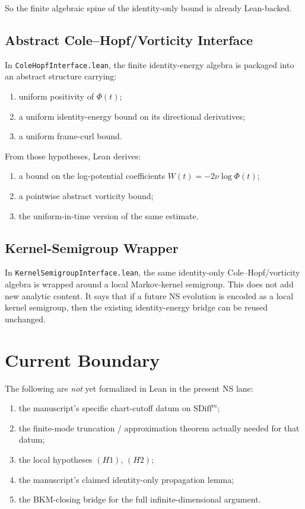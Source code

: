 \documentclass[11pt]{article}
\begin{document}
So the finite algebraic spine of the identity-only bound is already Lean-backed.

\subsection{Abstract Cole--Hopf/Vorticity Interface}

In \texttt{ColeHopfInterface.lean}, the finite identity-energy algebra is
packaged into an abstract structure carrying:
\begin{enumerate}[leftmargin=1.5em]
  \item uniform positivity of \(\Phi(t)\);
  \item a uniform identity-energy bound on its directional derivatives;
  \item a uniform frame-curl bound.
\end{enumerate}

From those hypotheses, Lean derives:
\begin{enumerate}[leftmargin=1.5em]
  \item a bound on the log-potential coefficients
  \(W(t) = -2\nu \log \Phi(t)\);
  \item a pointwise abstract vorticity bound;
  \item the uniform-in-time version of the same estimate.
\end{enumerate}

\subsection{Kernel-Semigroup Wrapper}

In \texttt{KernelSemigroupInterface.lean}, the same identity-only
Cole--Hopf/vorticity algebra is wrapped around a local Markov-kernel semigroup.
This does not add new analytic content.  It says that if a future NS evolution
is encoded as a local kernel semigroup, then the existing identity-energy
bridge can be reused unchanged.

\section{Current Boundary}

The following are \emph{not} yet formalized in Lean in the present NS lane:
\begin{enumerate}[leftmargin=1.5em]
  \item the manuscript's specific chart-cutoff datum on
  \(\mathrm{SDiff}^m\);
  \item the finite-mode truncation / approximation theorem actually needed for
  that datum;
  \item the local hypotheses \((H1)\), \((H2)\);
  \item the manuscript's claimed identity-only propagation lemma;
  \item the BKM-closing bridge for the full infinite-dimensional argument.
\end{enumerate}
\end{document}

